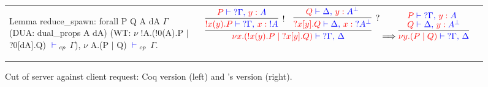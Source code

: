 \begin{figure*}
\begin{tabular*}{\textwidth}{lc}
\begin{coq}
Lemma reduce_spawn:
  forall P Q A dA $\Gamma$
         (DUA: dual_props A dA)
         (WT: $\nu$ !A.(!0(A).P $\mid$ ?0[dA].Q) ${\color{blue} {} \vdash {}}_{cp}$ $\Gamma$),
    $\nu$ A.(P $\mid$ Q) ${\color{blue} {} \vdash {}}_{cp}$ $\Gamma$.
\end{coq} &
\begin{math}
\begin{array}{c}
\colored
\inference{
  \inference{
    \tm{P} \tpvdash \tp{{?\Gamma} \comma \tmof{y}A}
  }{!}{
    \tm{!x(y).P} \tpvdash \tp{{?\Gamma} \comma \tmof{x}{!A}}
  }
  &
  \inference{
    \tm{Q} \tpvdash \tp{\Delta \comma \tmof{y}\dualbt{A}}
  }{?}{
    \tm{?x[y].Q} \tpvdash \tp{\Delta \comma \tmof{x}{?\dualbt{A}}}
  }
}{}{
  \tm{\nu x \Of{!A}.(!x(y).P \mid {?x[y].Q})} \tpvdash
    \tp{{?\Gamma} \comma \Delta}
}
\becomes
\inference{
  \tm{P} \tpvdash \tp{{?\Gamma} \comma \tmof{y}A}
  \\
  \tm{Q} \tpvdash \tp{\Delta \comma \tmof{y}\dualbt{A}}
}{}{
  \tm{\nu y\Of{A}.(P \mid Q)} \tpvdash \tp{{?\Gamma} \comma \Delta}
}
\end{array}
\end{math}
\end{tabular*}
\caption{Cut of server against client request: Coq version (left) and
  \citeauthor{Wadler:2014}'s version (right).}
\label{fig:principal}
\end{figure*}
